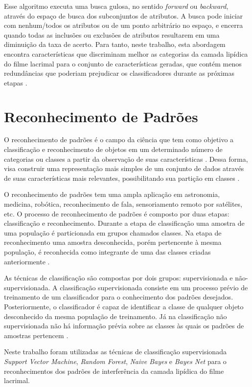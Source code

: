 Esse algoritmo executa uma busca gulosa, no sentido \textit{forward} ou \textit{backward}, através do espaço de busca dos subconjuntos de atributos. A busca pode iniciar com nenhum/todos os atributos ou de um ponto arbitrário no espaço, e encerra quando todas as inclusões ou exclusões de atributos resultarem em uma diminuição da taxa de acerto. Para tanto, neste trabalho, esta abordagem encontra características que discriminam melhor as categorias da camada lipídica do filme lacrimal para o conjunto de características geradas, que contém menos redundâncias que poderiam prejudicar os classificadores durante as próximas etapas \cite{ambelu2010comparison}.

\section{Reconhecimento de Padrões}
\label{sec:recPadroes}

O reconhecimento de padrões é o campo da ciência que tem como objetivo a classificação e reconhecimento de objetos em um determinado número de categorias ou classes a partir da observação de suas características \cite{Theodoridis:2008:PRF:1457541}. Dessa forma, visa construir uma representação mais simples de um conjunto de dados através de suas características mais relevantes, possibilitando sua partição em classes \cite{Duda:2000:PC:954544}.

O reconhecimento de padrões tem uma ampla aplicação em astronomia, medicina, robótica, reconhecimento de fala, sensoriamento remoto por satélites, etc. O processo de reconhecimento de padrões é composto por duas etapas: classificação e reconhecimento. Durante a etapa de classificação uma amostra de uma população é particionada em grupos chamados classes. Na etapa de reconhecimento uma amostra desconhecida, porém pertencente à mesma população, é reconhecida como integrante de uma das classes criadas anteriormente \cite{looney1997pattern}.

As técnicas de classificação são compostas por dois grupos: supervisionada e não-supervisionada. A classificação supervisionada consiste em um processo prévio de treinamento de um classificador para o conhecimento dos padrões desejados. Posteriormente, o classificador é capaz de identificar a classe de qualquer objeto desconhecido da mesma população de treinamento. Já na classificação não supervisionada não há informação prévia sobre as classes às quais os padrões de amostras pertencem \cite{pedrini2008analise}.

Neste trabalho foram utilizadas as técnicas de classificação supervisionada \textit{Support Vector Machine}, \textit{Random Forest}, \textit{Naive Bayes} e \textit{Bayes Net} para o reconhecimentos dos padrões de interferência da camada lipídica do filme lacrimal.

